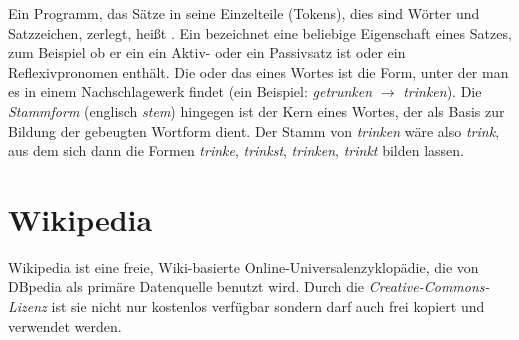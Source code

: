 Ein Programm, das Sätze in seine Einzelteile (Tokens), dies sind Wörter und Satzzeichen, zerlegt, heißt . %
Ein  bezeichnet eine beliebige Eigenschaft eines Satzes, zum Beispiel ob er ein ein Aktiv- oder ein Passivsatz ist oder ein Reflexivpronomen enthält.
Die  oder das  eines Wortes ist die Form, unter der man es in einem Nachschlagewerk findet
(ein Beispiel: \emph{getrunken} $\rightarrow$ \emph{trinken}).
Die \emph{Stammform} (englisch \emph{stem}) hingegen ist der Kern eines Wortes, der als Basis zur Bildung der gebeugten Wortform dient.
Der Stamm von \emph{trinken} wäre also \emph{trink}, aus dem sich dann die Formen \emph{trinke}, \emph{trinkst}, \emph{trinken}, \emph{trinkt} bilden lassen.

\section{Wikipedia}
Wikipedia ist eine freie, Wiki-basierte Online-Universalenzyklopädie, die von DBpedia als primäre Datenquelle benutzt wird.
Durch die \emph{Creative-Commons-Lizenz} ist sie nicht nur kostenlos verfügbar sondern darf auch frei kopiert und verwendet werden.

